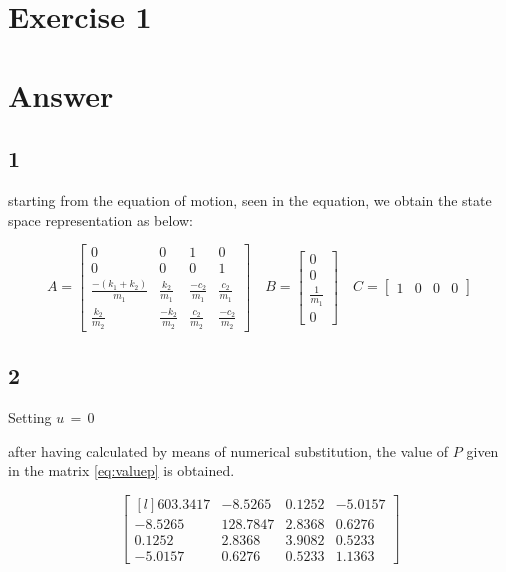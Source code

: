 \section{Exercise 1}

\section{Answer}
\subsection{1}

starting from the equation of motion, seen in the equation, we obtain the
state space representation as below:

\[
A =
\begin{bmatrix}
	0  	& 		0 		&      1	 	&     0\\
	0 	&     0 		&      0 		&     1\\
	\frac{-(k_1 + k_2)}{m_1} & \frac{k_2}{m_1} & \frac{-c_2}{m_1} & \frac{c_2}{m_1}\\
	\frac{k_2}{m_2} & \frac{-k_2}{m_2} & \frac{c_2}{m_2} & \frac{-c_2}{m_2}
	\end{bmatrix}\quad
	B =
	\begin{bmatrix}
		0\\
		0\\
		\frac{1}{m_1}\\
		0
		\end{bmatrix}\quad
		C =
		\begin{bmatrix}
			1   &  0   &  0  &   0
		\end{bmatrix}
		\]

		\subsection{2}
		Setting $u\,=\,0$

		after having calculated by means of numerical substitution, the value of $P$
		given in the matrix \ref{eq:valuep} is obtained.

		\begin{equation}
			\label{eq:valuep}
			\begin{bmatrix*}[l]
				603.3417	&   -8.5265	&    0.1252	&   -5.0157\\
				-8.5265	&  128.7847	&    2.8368	&    0.6276\\
				0.1252	&    2.8368	&    3.9082	&    0.5233\\
				-5.0157	&    0.6276	&    0.5233	&    1.1363
			\end{bmatrix*}
		\end{equation}



